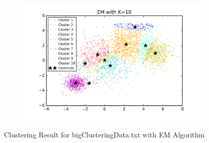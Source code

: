 \begin{figure}[htb]
\begin{subfigure}[b]{0.475\textwidth}
            \includegraphics[width=\textwidth]{./figures/bigClustering_EM_10.png}
        \end{subfigure}
        
        \caption{Clustering Result for bigClusteringData.txt with EM Algorithm}
        \label{fig:kmean_clustering}
\end{figure}

